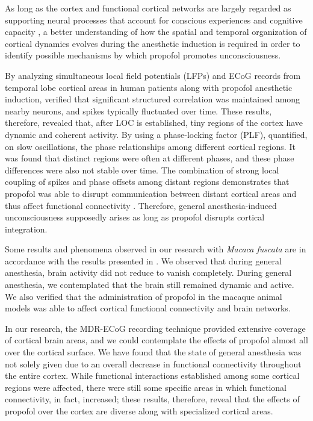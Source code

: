 \documentclass[twoside]{article}
\begin{document}
\begin{multicols}{2}
 As long as the cortex and functional cortical networks are largely regarded as supporting neural processes that account for conscious experiences and cognitive capacity \citep{mcintosh2000towards,stam2007graph,tononi1998consciousness}, a better understanding of how the spatial and temporal organization of cortical dynamics evolves during the anesthetic induction is required in order to identify possible mechanisms by which propofol promotes unconsciousness.
 
By analyzing simultaneous local field potentials (LFPs) and ECoG records from temporal lobe cortical areas in human patients along with propofol anesthetic induction, \citep{lewis2012rapid} verified that significant structured correlation was maintained among nearby neurons, and spikes typically fluctuated over time. These results, therefore, revealed that, after LOC is established, tiny regions of the cortex have dynamic and coherent activity. 
By using a phase-locking factor (PLF), \citep{lewis2012rapid} quantified, on slow oscillations, the phase relationships among different cortical regions. It was found that distinct regions were often at different phases, and these phase differences were also not stable over time. The combination of strong local coupling of spikes and phase offsets among distant regions demonstrates that propofol was able to disrupt communication between distant cortical areas and thus affect functional connectivity \citep{lewis2012rapid}. Therefore, general anesthesia-induced unconsciousness supposedly arises as long as propofol disrupts cortical integration. 


Some results and phenomena observed in our research with \textit{Macaca fuscata} are in accordance with the results presented in \citep{lewis2012rapid}. We observed that during general anesthesia, brain activity did not reduce to vanish completely. During general anesthesia, we contemplated that the brain still remained dynamic and active. We also verified that the administration of propofol in the macaque animal models was able to affect cortical functional connectivity and brain networks. 

In our research, the MDR-ECoG recording technique provided extensive coverage of cortical brain areas, and we could contemplate the effects of propofol almost all over the cortical surface. We have found that the state of general anesthesia was not solely given due to an overall decrease in functional connectivity throughout the entire cortex. While functional interactions established among some cortical regions were affected, there were still some specific areas in which functional connectivity, in fact, increased; these results, therefore, reveal that the effects of propofol over the cortex are diverse along with specialized cortical areas.\\



\end{multicols}
\end{document}
